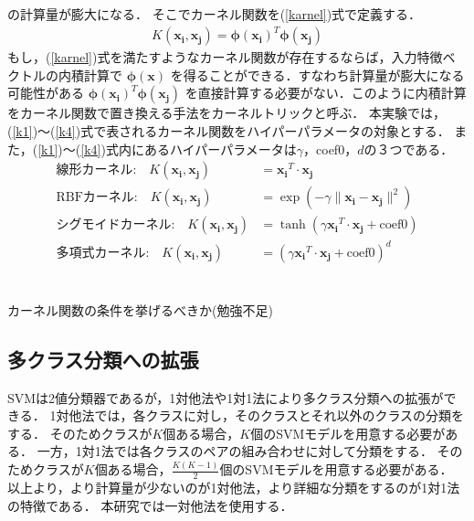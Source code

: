の計算量が膨大になる．
そこでカーネル関数を(\ref{karnel})式で定義する．
\begin{align}
    \label{karnel}
  K( \boldsymbol{x_i}, \boldsymbol{x_j}) = \boldsymbol{\phi}(\boldsymbol{x_i})^T \boldsymbol{\phi}(\boldsymbol{x_j})
\end{align}
もし，(\ref{karnel})式を満たすようなカーネル関数が存在するならば，入力特徴ベクトルの内積計算で
$\boldsymbol{\phi}(\boldsymbol{x})$
を得ることができる．すなわち計算量が膨大になる可能性がある
$\boldsymbol{\phi}(\boldsymbol{x_i})^T \boldsymbol{\phi}(\boldsymbol{x_j})$
を直接計算する必要がない．このように内積計算をカーネル関数で置き換える手法をカーネルトリックと呼ぶ．
本実験では，(\ref{k1})〜(\ref{k4})式で表されるカーネル関数をハイパーパラメータの対象とする．
また，(\ref{k1})〜(\ref{k4})式内にあるハイパーパラメータは$\gamma$，coef0，$d$の３つである．
\begin{align}
    \text{線形カーネル:} \quad K(\boldsymbol{x_i}, \boldsymbol{x_j}) &= \boldsymbol{x_i}^T \cdot \boldsymbol{x_j}\label{k1} \\
    \text{RBFカーネル:} \quad K(\boldsymbol{x_i}, \boldsymbol{x_j}) &= \exp\left(-\gamma \| \boldsymbol{x_i} - \boldsymbol{x_j} \|^2\right)\label{k2} \\
    \text{シグモイドカーネル:} \quad K(\boldsymbol{x_i}, \boldsymbol{x_j}) &= \tanh(\gamma \boldsymbol{x_i}^T \cdot \boldsymbol{x_j} + \text{coef0}) \label{k3}\\
    \text{多項式カーネル:} \quad K(\boldsymbol{x_i}, \boldsymbol{x_j}) &= (\gamma\boldsymbol{x_i}^T \cdot \boldsymbol{x_j} + \text{coef0})^d\label{k4}
\end{align}
\\\\
カーネル関数の条件を挙げるべきか(勉強不足)
\subsection{多クラス分類への拡張}
SVMは2値分類器であるが，1対他法や1対1法により多クラス分類への拡張ができる．
1対他法では，各クラスに対し，そのクラスとそれ以外のクラスの分類をする．
そのためクラスが$K$個ある場合，$K$個のSVMモデルを用意する必要がある．
一方，1対1法では各クラスのペアの組み合わせに対して分類をする．
そのためクラスが$K$個ある場合，$\frac{K(K-1)}{2}$個のSVMモデルを用意する必要がある．
以上より，より計算量が少ないのが1対他法，より詳細な分類をするのが1対1法の特徴である．
本研究では一対他法を使用する．

